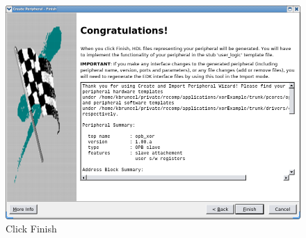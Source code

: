 \documentclass[a4paper,oneside]{memoir}
\begin{document}
\begin{figure}[H]
\centering
\includegraphics[scale=0.5]{COIP11}
\caption{Click Finish\label{fig:COIP11}}
\end{figure}
\end{document}
